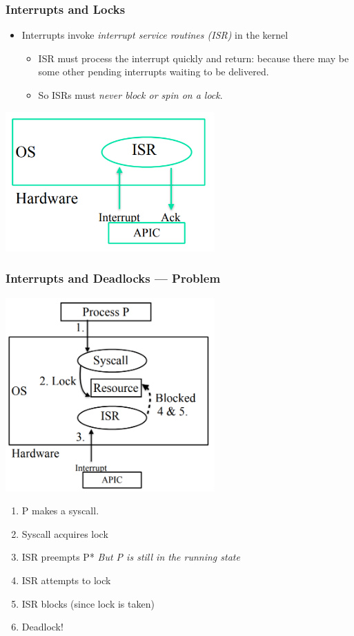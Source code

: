 \documentclass[12pt]{article}
\begin{document}
\subsubsection{Interrupts and Locks}
\begin{itemize}
    \item Interrupts invoke \emph{interrupt service routines (ISR)} in the kernel \begin{itemize}
        \item ISR must process the interrupt quickly and return: because there may be some other pending interrupts waiting to be delivered.
        \item So ISRs must \emph{never block or spin on a lock}.
    \end{itemize}
\end{itemize}
\includegraphics[width=0.6\textwidth]{InterruptServiceRoutine.png}
\subsubsection{Interrupts and Deadlocks — Problem}
\includegraphics[width=0.6\textwidth]{InterruptAndDeadlock.png}
\begin{enumerate}
    \item P makes a syscall.
    \item Syscall acquires lock
    \item ISR preempts P* \emph{But P is still in the running state}
    \item ISR attempts to lock
    \item ISR blocks (since lock is taken)
    \item Deadlock!    
\end{enumerate}
\end{document}
